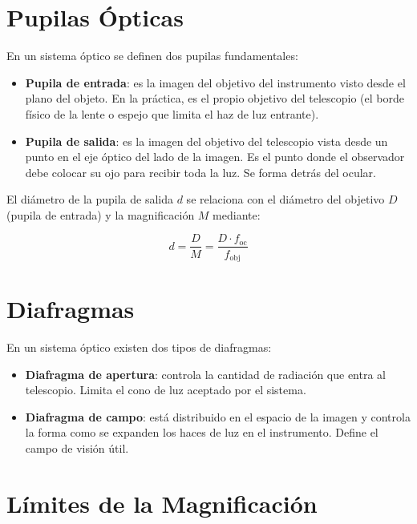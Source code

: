 

\section{Pupilas Ópticas}

En un sistema óptico se definen dos pupilas fundamentales:

\begin{itemize}
    \item \textbf{Pupila de entrada}: es la imagen del objetivo del instrumento visto desde el plano del objeto. En la práctica, es el propio objetivo del telescopio (el borde físico de la lente o espejo que limita el haz de luz entrante).
    \item \textbf{Pupila de salida}: es la imagen del objetivo del telescopio vista desde un punto en el eje óptico del lado de la imagen. Es el punto donde el observador debe colocar su ojo para recibir toda la luz. Se forma detrás del ocular.
\end{itemize}

El diámetro de la pupila de salida $d$ se relaciona con el diámetro del objetivo $D$ (pupila de entrada) y la magnificación $M$ mediante:

$$d = \frac{D}{M} = \frac{D \cdot f_{\text{oc}}}{f_{\text{obj}}}$$



\section{Diafragmas}

En un sistema óptico existen dos tipos de diafragmas:

\begin{itemize}
    \item \textbf{Diafragma de apertura}: controla la cantidad de radiación que entra al telescopio. Limita el cono de luz aceptado por el sistema.
    \item \textbf{Diafragma de campo}: está distribuido en el espacio de la imagen y controla la forma como se expanden los haces de luz en el instrumento. Define el campo de visión útil.
\end{itemize}

\section{Límites de la Magnificación}


